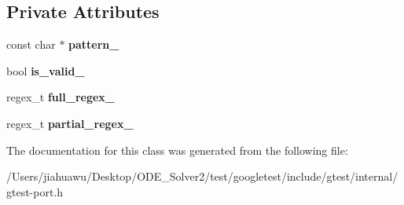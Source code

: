\subsection*{Private Attributes}
\begin{DoxyCompactItemize}
\item 
\mbox{\label{classtesting_1_1internal_1_1_r_e_a44ab32241fab42db5b6f7482776658ec}} 
const char $\ast$ {\bfseries pattern\+\_\+}
\item 
\mbox{\label{classtesting_1_1internal_1_1_r_e_af9062fefab96529ff785f50097416d64}} 
bool {\bfseries is\+\_\+valid\+\_\+}
\item 
\mbox{\label{classtesting_1_1internal_1_1_r_e_a1627cf3c6e38a83518e7aefd659b938b}} 
regex\+\_\+t {\bfseries full\+\_\+regex\+\_\+}
\item 
\mbox{\label{classtesting_1_1internal_1_1_r_e_a1b3e42916c61db479ae90c7a96c22a58}} 
regex\+\_\+t {\bfseries partial\+\_\+regex\+\_\+}
\end{DoxyCompactItemize}


The documentation for this class was generated from the following file\+:\begin{DoxyCompactItemize}
\item 
/\+Users/jiahuawu/\+Desktop/\+O\+D\+E\+\_\+\+Solver2/test/googletest/include/gtest/internal/gtest-\/port.\+h\end{DoxyCompactItemize}
